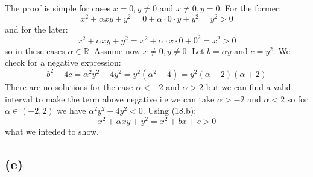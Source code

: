 \documentclass{article}
\begin{document}
The proof is simple for cases \(x = 0, y \neq 0\) and \(x \neq 0, y = 0\). For the former:
\begin{equation*}
	x^{2} + \alpha xy + y^{2} = 0 + \alpha \cdot 0 \cdot y + y^{2} = y^{2} > 0 
\end{equation*}
and for the later:
\begin{equation*}
	x^{2} + \alpha xy + y^{2} = x^{2} + \alpha \cdot x \cdot 0 + 0^{2} = x^{2} > 0 
\end{equation*}
so in these cases \(\alpha \in \mathbb{R}\). Assume now \(x \neq 0, y \neq 0\). Let \(b = \alpha y\)
and \(c = y^{2}\). We check for a negative expression:
\begin{equation*}
	b^{2} - 4c = \alpha^{2}y^{2} - 4y^{2} = y^{2}(\alpha^{2} - 4) = y^{2}(\alpha - 2)(\alpha + 2)
\end{equation*}
There are no solutions for the case \(\alpha < -2\) and \(\alpha > 2\) but we can find a valid interval
to make the term above negative i.e we can take \(\alpha > -2\) and \(\alpha < 2\) so for
\(\alpha \in (-2, 2)\) we have \(\alpha^{2}y^{2} - 4y^{2} < 0\). Using (18.b):
\begin{equation*}
	x^{2} + \alpha xy + y^{2} = x^{2} + bx + c > 0
\end{equation*}
what we inteded to show.


\subsection*{(e)}
\end{document}
